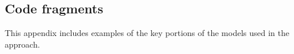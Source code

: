 \documentclass[runningheads]{llncs}
\begin{document}
\begin{subappendices}

\section{\tamarin{} Code fragments}
This appendix includes examples of the key portions of the \tamarin{} models used in the approach.



\end{subappendices}
%









\end{document}
